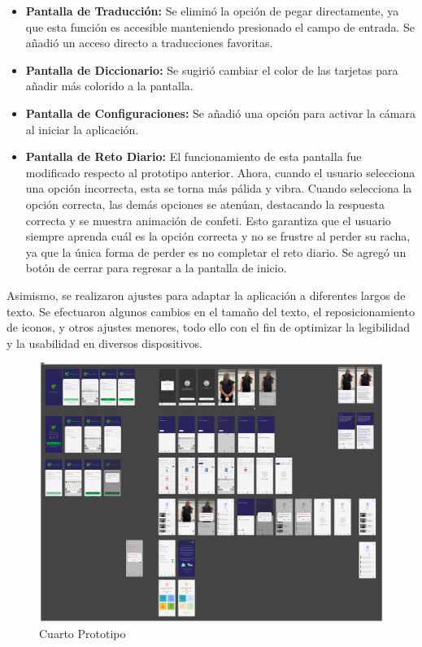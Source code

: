 \begin{itemize}
    \item \textbf{Pantalla de Traducción:} Se eliminó la opción de pegar directamente, ya que esta función es accesible manteniendo presionado el campo de entrada. Se añadió un acceso directo a traducciones favoritas.
    
    \item \textbf{Pantalla de Diccionario:} Se sugirió cambiar el color de las tarjetas para añadir más colorido a la pantalla.
    
    \item \textbf{Pantalla de Configuraciones:} Se añadió una opción para activar la cámara al iniciar la aplicación.
    
    \item \textbf{Pantalla de Reto Diario:} El funcionamiento de esta pantalla fue modificado respecto al prototipo anterior. Ahora, cuando el usuario selecciona una opción incorrecta, esta se torna más pálida y vibra. Cuando selecciona la opción correcta, las demás opciones se atenúan, destacando la respuesta correcta y se muestra animación de confeti. Esto garantiza que el usuario siempre aprenda cuál es la opción correcta y no se frustre al perder su racha, ya que la única forma de perder es no completar el reto diario. Se agregó un botón de cerrar para regresar a la pantalla de inicio.
\end{itemize}

Asimismo, se realizaron ajustes para adaptar la aplicación a diferentes largos de texto. Se efectuaron algunos cambios en el tamaño del texto, el reposicionamiento de iconos, y otros ajustes menores, todo ello con el fin de optimizar la legibilidad y la usabilidad en diversos dispositivos.


\begin{figure} [H]
    \centering
    \includegraphics[width=1\linewidth]{figuras/prototipo4.png}
    \caption{Cuarto Prototipo}
    \label{fig:enter-label}
\end{figure}



